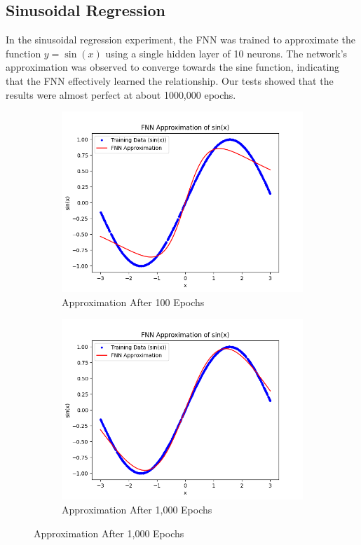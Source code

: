 \documentclass{article}
\begin{document}
\subsection{Sinusoidal Regression}
In the sinusoidal regression experiment, the FNN was trained to approximate the function $y = \sin(x)$ using a single hidden layer of 10 neurons. The network's approximation was observed to converge towards the sine function, indicating that the FNN effectively learned the relationship. Our tests showed that the results were almost perfect at about 1000,000 epochs.
\begin{figure}[h!]
    \centering
    \begin{subfigure}{0.45\textwidth}
        \centering
        \includegraphics[width=\linewidth]{figs/FNN_Test01.png}
        \caption*{Approximation After 100 Epochs}
        \label{fig:100epochs}
    \end{subfigure}
    \hfill
    \begin{subfigure}{0.45\textwidth}
        \centering
        \includegraphics[width=\linewidth]{figs/FNN_Test02.png}
        \caption*{Approximation After 1,000 Epochs}
        \label{fig:1000epochs}
    \end{subfigure}


\end{figure}
\end{document}

